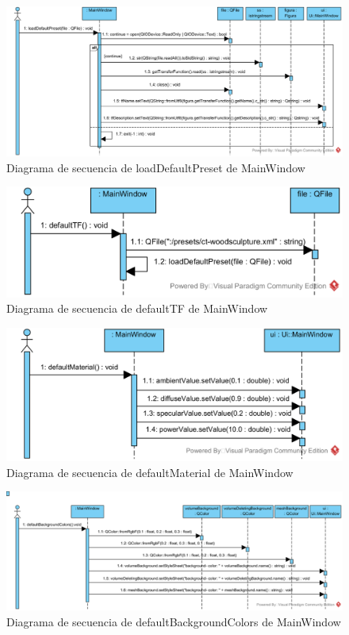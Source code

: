 \begin{figure}[H]
	\centering
	\includegraphics[width=12cm]{imagenes/diagramas/secuencia/MainWindow_LoadDefaultPreset}
	\caption{Diagrama de secuencia de loadDefaultPreset de MainWindow}
	\label{fig:diagrama_secuencia_mainWindow_loadDefaultPreset}
\end{figure}

\begin{figure}[H]
	\centering
	\includegraphics[width=12cm]{imagenes/diagramas/secuencia/MainWindow_DefaultTF}
	\caption{Diagrama de secuencia de defaultTF de MainWindow}
	\label{fig:diagrama_secuencia_mainWindow_defaultTF}
\end{figure}

\begin{figure}[H]
	\centering
	\includegraphics[width=12cm]{imagenes/diagramas/secuencia/MainWindow_DefaultMaterial}
	\caption{Diagrama de secuencia de defaultMaterial de MainWindow}
	\label{fig:diagrama_secuencia_mainWindow_defaultMaterial}
\end{figure}

\begin{figure}[H]
	\centering
	\includegraphics[width=12cm]{imagenes/diagramas/secuencia/MainWindow_DefaultBackgroundColors}
	\caption{Diagrama de secuencia de defaultBackgroundColors de MainWindow}
	\label{fig:diagrama_secuencia_mainWindow_defaultBackgroundColors}
\end{figure}


